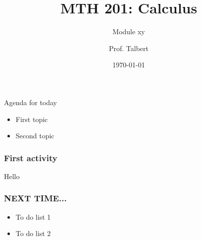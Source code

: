 \documentclass{beamer}
\title{MTH 201: Calculus}
\subtitle{Module xy}
\author{Prof. Talbert}
\institute{GVSU}
\date{\today}
\begin{document}
\frame{\titlepage}


\begin{frame}{Agenda for today}
    \begin{itemize}
        \item<1-> First topic
        \item<2-> Second topic 
    \end{itemize}
\end{frame}

\begin{frame}
    \frametitle{First activity}

    Hello

\end{frame}

\begin{frame}
    \frametitle{NEXT TIME...}

    \begin{itemize}
        \item To do list 1
        \item To do list 2
    \end{itemize}

\end{frame}
\end{document}
